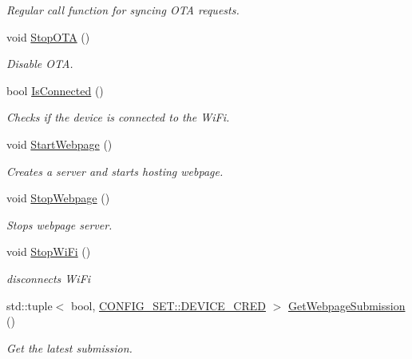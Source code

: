 \begin{DoxyCompactItemize}
\begin{DoxyCompactList}\small\item\em Regular call function for syncing O\+TA requests. \end{DoxyCompactList}\item 
void \hyperlink{classConnectivity_aa99aeadd725a7cd8edc7255775955807}{Stop\+O\+TA} ()
\begin{DoxyCompactList}\small\item\em Disable O\+TA. \end{DoxyCompactList}\item 
bool \hyperlink{classConnectivity_a806034c9ce5234a7fcc5370d5b6e8362}{Is\+Connected} ()
\begin{DoxyCompactList}\small\item\em Checks if the device is connected to the Wi\+Fi. \end{DoxyCompactList}\item 
void \hyperlink{classConnectivity_a72b0edad6e98830701aea73f90efd5b0}{Start\+Webpage} ()
\begin{DoxyCompactList}\small\item\em Creates a server and starts hosting webpage. \end{DoxyCompactList}\item 
void \hyperlink{classConnectivity_a5a123ddd0c4ab4061d1fa564fe3e7490}{Stop\+Webpage} ()
\begin{DoxyCompactList}\small\item\em Stops webpage server. \end{DoxyCompactList}\item 
void \hyperlink{classConnectivity_a5c562f136d52c4a91eedba957e68b71e}{Stop\+Wi\+Fi} ()
\begin{DoxyCompactList}\small\item\em disconnects Wi\+Fi \end{DoxyCompactList}\item 
std\+::tuple$<$ bool, \hyperlink{structCONFIG__SET_1_1DEVICE__CRED}{C\+O\+N\+F\+I\+G\+\_\+\+S\+E\+T\+::\+D\+E\+V\+I\+C\+E\+\_\+\+C\+R\+ED} $>$ \hyperlink{classConnectivity_a00c4168c7ac1db84abb5aa70f8f168c5}{Get\+Webpage\+Submission} ()
\begin{DoxyCompactList}\small\item\em Get the latest submission. \end{DoxyCompactList}\end{DoxyCompactItemize}
